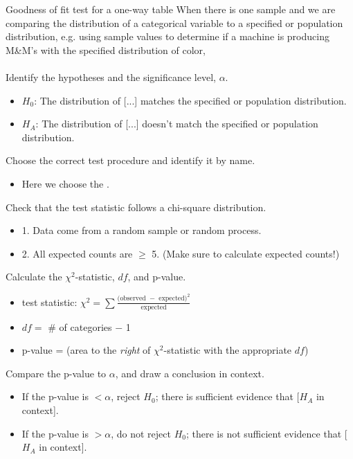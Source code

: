 \begin{onebox}{Goodness of fit test for a one-way table}
 When there is one sample and we are comparing the distribution of a categorical variable to a specified or population distribution, e.g. using sample values to determine if a machine is producing M\&M's with the specified distribution of color, 
\\
\\
 Identify the hypotheses and the significance level, $\alpha$. \vspace{-1mm}
\begin{itemize}
\setlength{\itemsep}{0mm}
\item[]  $H_0$: The distribution of [...] matches the specified or population distribution. 
\item[] $H_A$: The distribution of [...] doesn't match the specified or population distribution.
\end{itemize}
 Choose the correct test procedure and identify it by name.\vspace{-1mm}
\begin{itemize}
\item[]  Here we choose the .
\end{itemize}
 Check that the test statistic follows a chi-square distribution.\vspace{-1mm}
\begin{itemize}
\setlength{\itemsep}{0mm}
\item[] 1.  Data come from a random sample or random process.
\item[] 2.  All expected counts are $\ge$ 5.  (Make sure to calculate expected counts!)
\end{itemize}
 Calculate the $\chi^2$-statistic, $df$, and p-value.\vspace{-1mm}  
\begin{itemize}
\setlength{\itemsep}{0mm}
\item[] test statistic:  $\chi^2 =\sum{ \frac{\text{(observed } - \text{ expected})^2}{\text{expected}}}$ 
\item[] $df =$ \# of categories $-$ 1
\item[] p-value = (area to the \emph{right} of $\chi^2$-statistic with the appropriate $df$)
\end{itemize}
 Compare the p-value to $\alpha$, and draw a conclusion in context.
\begin{itemize}\vspace{-1mm}
\setlength{\itemsep}{0mm}
\item[] If the p-value is $< \alpha$, reject $H_0$; there is sufficient evidence that [$H_A$ in context]. 
\item[] If the p-value is $> \alpha$, do not reject $H_0$; there is not sufficient evidence that [$H_A$ in context].
\end{itemize}
\end{onebox}


